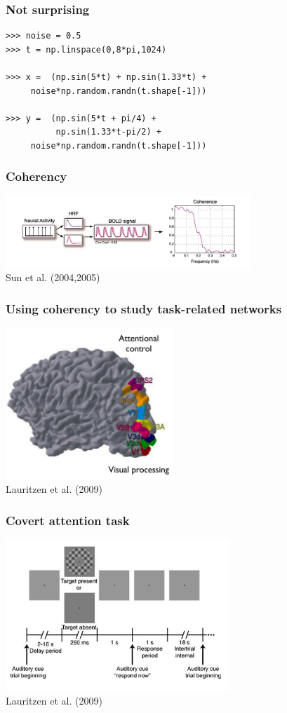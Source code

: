 \documentclass{beamer}
\begin{document}
\begin{frame}[fragile]
\frametitle{Not surprising}
\begin{lstlisting}
>>> noise = 0.5
>>> t = np.linspace(0,8*pi,1024) 

>>> x =  (np.sin(5*t) + np.sin(1.33*t) +  
     noise*np.random.randn(t.shape[-1]))

>>> y =  (np.sin(5*t + pi/4) + 
          np.sin(1.33*t-pi/2) +
     noise*np.random.randn(t.shape[-1]))
\end{lstlisting}
\end{frame}

\begin{frame}
\frametitle{Coherency}
\includegraphics[height=2.7cm]{figures/tseries_w_hemo_w_coh}
\\
\hfill
Sun et al. (2004,2005)
\end{frame}

\begin{frame}
\frametitle{Using coherency to study task-related networks}
\includegraphics[height=5.7cm]{figures/lauritzen1}
\\
\hfill 
Lauritzen et al. (2009)
\end{frame}


\begin{frame}
\frametitle{Covert attention task}
\includegraphics[height=5.7cm]{figures/lauritzen2}
\\
\hfill 
Lauritzen et al. (2009)
\end{frame}
\end{document}
